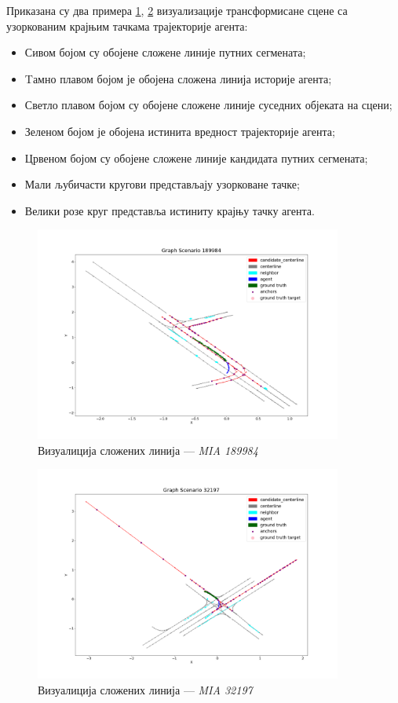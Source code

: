 \documentclass[11pt,oneside]{memoir}
\begin{document}
Приказана су два примера \ref{poly-MIA-189984}, \ref{poly-MIA-32197} визуализације трансформисане сцене са узоркованим крајњим тачкама трајекторије агента:
\begin{itemize}
  \item Сивом бојом су обојене сложене линије путних сегмената; 
  \item Tамно плавом бојом је обојена сложена линија историје агента; 
  \item Светло плавом бојом су обојене сложене линије суседних објеката на сцени;
  \item Зеленом бојом је обојена истинита вредност трајекторије агента;
  \item Црвеном бојом су обојене сложене линије кандидата путних сегмената;
  \item Мали љубичасти кругови представљају узорковане тачке;
  \item Велики розе круг представља истиниту крајњу тачку агента.
\end{itemize}

\begin{figure}[H]
  \centering
  \includegraphics[width=0.9\textwidth]{images/polylines_MIA_189984.png}
  \caption{Визуалиција сложених линија --- \textit{MIA 189984} \label{poly-MIA-189984}}
\end{figure}

\begin{figure}[H]
  \centering
  \includegraphics[width=0.9\textwidth]{images/polylines_MIA_32197.png}
  \caption{Визуалиција сложених линија --- \textit{MIA 32197} \label{poly-MIA-32197}}
\end{figure}
\end{document}
